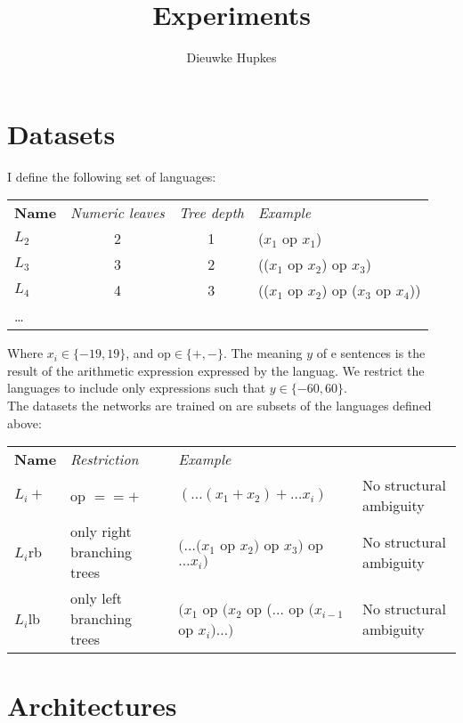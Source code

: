 \documentclass{article}
\author{Dieuwke Hupkes}
\title{Experiments}
\date{}
\begin{document}
\maketitle

\section{Datasets}

I define the following set of languages:

\begin{table}[!ht]
\begin{tabular}{|lccl|}
    \hline
    \textbf{Name} & \textit{Numeric leaves} & \textit{Tree depth} & \textit{Example}\\
    $L_2$ & 2 & 1 & ($x_1$ op $x_1$)\\
    $L_3$ & 3 & 2 & (($x_1$ op $x_2$) op $x_3$)\\
    $L_4$ & 4 & 3 & (($x_1$ op $x_2$) op ($x_3$ op $x_4$))\\
    \dots& & &\\
    \hline
\end{tabular}
\end{table}

\noindent Where $x_i\in\{-19,19\}$, and op$\in\{+,-\}$. The meaning $y$ of e sentences is the result of the arithmetic expression expressed by the languag. We restrict the languages to include only expressions such that $y\in\{-60,60\}$.\\

\noindent The datasets the networks are trained on are subsets of the languages defined above:

\begin{table}[ht!]
\begin{tabular}{llll}
    \textbf{Name} & \textit{Restriction} & \textit{Example} &\\
    $L_i+$ & op $==+$ & $(\ldots(x_1 + x_2) + \dots x_i)$ & No structural ambiguity\\
    $L_i$rb & only right branching trees & $(\ldots(x_1$ op $x_2)$ op $x_3)$ op $\ldots x_i)$ & No structural ambiguity \\
    $L_i$lb & only left branching trees & $(x_1$ op $(x_2$ op ($\ldots$ op $(x_{i-1}$ op $x_i)\ldots)$ & No structural ambiguity \\

\end{tabular}
\end{table}

\section{Architectures}
\end{document}
